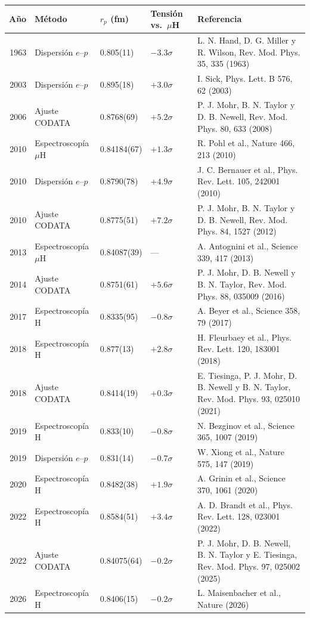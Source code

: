\begin{tabular}{rllll}
\toprule
A\~no & M\'etodo & $r_p$ (fm) & Tensi\'on vs.\ $\mu$H & Referencia \\
\midrule
1963 & Dispersi\'on $e$--$p$ & 0.805(11) & $-3.3\sigma$ & L. N. Hand, D. G. Miller y R. Wilson, Rev. Mod. Phys. 35, 335 (1963) \\
2003 & Dispersi\'on $e$--$p$ & 0.895(18) & $+3.0\sigma$ & I. Sick, Phys. Lett. B 576, 62 (2003) \\
2006 & Ajuste CODATA & 0.8768(69) & $+5.2\sigma$ & P. J. Mohr, B. N. Taylor y D. B. Newell, Rev. Mod. Phys. 80, 633 (2008) \\
2010 & Espectroscop\'ia $\mu$H & 0.84184(67) & $+1.3\sigma$ & R. Pohl et al., Nature 466, 213 (2010) \\
2010 & Dispersi\'on $e$--$p$ & 0.8790(78) & $+4.9\sigma$ & J. C. Bernauer et al., Phys. Rev. Lett. 105, 242001 (2010) \\
2010 & Ajuste CODATA & 0.8775(51) & $+7.2\sigma$ & P. J. Mohr, B. N. Taylor y D. B. Newell, Rev. Mod. Phys. 84, 1527 (2012) \\
2013 & Espectroscop\'ia $\mu$H & 0.84087(39) & --- & A. Antognini et al., Science 339, 417 (2013) \\
2014 & Ajuste CODATA & 0.8751(61) & $+5.6\sigma$ & P. J. Mohr, D. B. Newell y B. N. Taylor, Rev. Mod. Phys. 88, 035009 (2016) \\
2017 & Espectroscop\'ia H & 0.8335(95) & $-0.8\sigma$ & A. Beyer et al., Science 358, 79 (2017) \\
2018 & Espectroscop\'ia H & 0.877(13) & $+2.8\sigma$ & H. Fleurbaey et al., Phys. Rev. Lett. 120, 183001 (2018) \\
2018 & Ajuste CODATA & 0.8414(19) & $+0.3\sigma$ & E. Tiesinga, P. J. Mohr, D. B. Newell y B. N. Taylor, Rev. Mod. Phys. 93, 025010 (2021) \\
2019 & Espectroscop\'ia H & 0.833(10) & $-0.8\sigma$ & N. Bezginov et al., Science 365, 1007 (2019) \\
2019 & Dispersi\'on $e$--$p$ & 0.831(14) & $-0.7\sigma$ & W. Xiong et al., Nature 575, 147 (2019) \\
2020 & Espectroscop\'ia H & 0.8482(38) & $+1.9\sigma$ & A. Grinin et al., Science 370, 1061 (2020) \\
2022 & Espectroscop\'ia H & 0.8584(51) & $+3.4\sigma$ & A. D. Brandt et al., Phys. Rev. Lett. 128, 023001 (2022) \\
2022 & Ajuste CODATA & 0.84075(64) & $-0.2\sigma$ & P. J. Mohr, D. B. Newell, B. N. Taylor y E. Tiesinga, Rev. Mod. Phys. 97, 025002 (2025) \\
2026 & Espectroscop\'ia H & 0.8406(15) & $-0.2\sigma$ & L. Maisenbacher et al., Nature (2026) \\
\bottomrule
\end{tabular}
